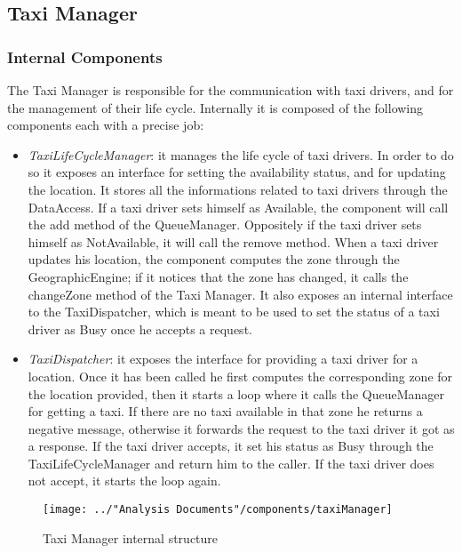 \subsection{Taxi Manager}\label{comp:taxiManager}
\subsubsection{Internal Components}
The Taxi Manager is responsible for the communication with taxi drivers, and for the management of their life cycle. Internally it is composed of the following components each with a precise job:
\begin{itemize}
	\item \textit{TaxiLifeCycleManager}: it manages the life cycle of taxi drivers. In order to do so it exposes an interface for setting the availability status, and for updating the location. It stores all the informations related to taxi drivers through the DataAccess. If a taxi driver sets himself as Available, the component will call the add method of the QueueManager. Oppositely if the taxi driver sets himself as NotAvailable, it will call the remove method. When a taxi driver updates his location, the component computes the zone through the GeographicEngine; if it notices that the zone has changed, it calls the changeZone method of the Taxi Manager. It also exposes an internal interface to the TaxiDispatcher, which is meant to be used to set the status of a taxi driver as Busy once he accepts a request.
	\item \textit{TaxiDispatcher}: it exposes the interface for providing a taxi driver for a location. Once it has been called he first computes the corresponding zone for the location provided, then it starts a loop where it calls the QueueManager for getting a taxi. If there are no taxi available in that zone he returns a negative message, otherwise it forwards the request to the taxi driver it got as a response. If the taxi driver accepts, it set his status as Busy through the TaxiLifeCycleManager and return him to the caller. If the taxi driver does not accept, it starts the loop again.
\end{itemize}
\begin{figure}[H]
	\centering
	\texttt{[image: ../"Analysis Documents"/components/taxiManager]}
	\label{fig:taximanager}
	\caption{Taxi Manager internal structure}
\end{figure}
